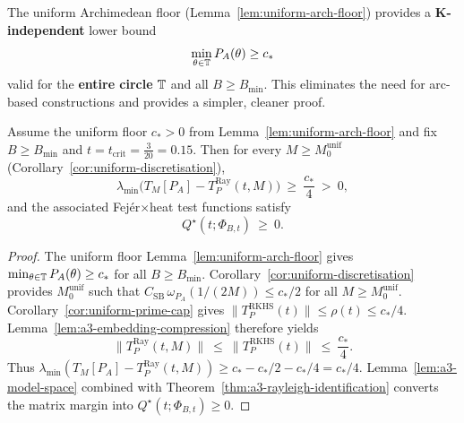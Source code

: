 
The uniform Archimedean floor (Lemma~\ref{lem:uniform-arch-floor}) provides a \textbf{K-independent} lower bound
\[
  \min_{\theta\in\mathbb T}P_A(\theta)\ge c_*
\]
valid for the \textbf{entire circle} $\mathbb T$ and all $B\ge B_{\min}$.
This eliminates the need for arc-based constructions and provides a simpler, cleaner proof.


\begin{theorem}\label{thm:A3}
Assume the uniform floor $c_*>0$ from Lemma~\ref{lem:uniform-arch-floor} and fix
$B\ge B_{\min}$ and $t=t_{\mathrm{crit}}=\tfrac{3}{20}=0.15$.
Then for every $M\ge M_0^{\mathrm{unif}}$ (Corollary~\ref{cor:uniform-discretisation}),
\[
  \lambda_{\min}\!\bigl(T_M[P_A]-T_P^{\mathrm{Ray}}(t,M)\bigr)\ \ge\ \frac{c_*}{4}\ >\ 0,
\]
and the associated Fej\'er$\times$heat test functions satisfy
\[
  Q^\star(t;\Phi_{B,t})\ \ge\ 0.
\]
\end{theorem}

\begin{proof}
The uniform floor Lemma~\ref{lem:uniform-arch-floor} gives $\min_{\theta\in\mathbb T} P_A(\theta)\ge c_*$
for all $B\ge B_{\min}$. Corollary~\ref{cor:uniform-discretisation} provides
$M_0^{\mathrm{unif}}$ such that $C_{\mathrm{SB}}\,\omega_{P_A}(1/(2M))\le c_*/2$ for all $M\ge M_0^{\mathrm{unif}}$.
Corollary~\ref{cor:uniform-prime-cap} gives $\|T_P^{\mathrm{RKHS}}(t)\|\le \rho(t)\le c_*/4$.
Lemma~\ref{lem:a3-embedding-compression} therefore yields
\[
  \|T_P^{\mathrm{Ray}}(t,M)\|\ \le\ \|T_P^{\mathrm{RKHS}}(t)\|\ \le\ \frac{c_*}{4}.
\]
Thus $\lambda_{\min}(T_M[P_A]-T_P^{\mathrm{Ray}}(t,M))\ge c_* - c_*/2 - c_*/4 = c_*/4$.
Lemma~\ref{lem:a3-model-space} combined with Theorem~\ref{thm:a3-rayleigh-identification}
converts the matrix margin into $Q^\star(t;\Phi_{B,t})\ge0$.
\end{proof}
